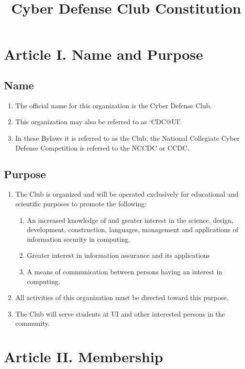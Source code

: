 \documentclass[12pt]{scrartcl} %
\title{Cyber Defense Club Constitution}
\date{}
\begin{document}
\maketitle


\section{Article I. Name and Purpose}
	\subsection{Name}
		\begin{enumerate}
			\item The official name for this organization is the Cyber Defense Club.
			\item This organization may also be referred to as `CDC@UI'.
			\item In these Bylaws it is referred to as the Club; the National Collegiate Cyber Defense Competition is referred to the NCCDC or CCDC.
		\end{enumerate}
	\subsection{Purpose}
		\begin{enumerate}
			\item The Club is organized and will be operated exclusively for educational and scientific purposes to promote the following:
			\begin{enumerate}  				 
				\item An increased knowledge of and greater interest in the science, design, development, construction, languages, management and applications of information security in computing. 
				\item Greater interest in information assurance and its applications\ 
				\item A means of communication between persons having an interest in computing.
			\end{enumerate}
			\item All activities of this organization must be directed toward this purpose.
			\item The Club will serve students at UI and other interested persons in the community.
		\end{enumerate}
\section{Article II. Membership}
\end{document}
